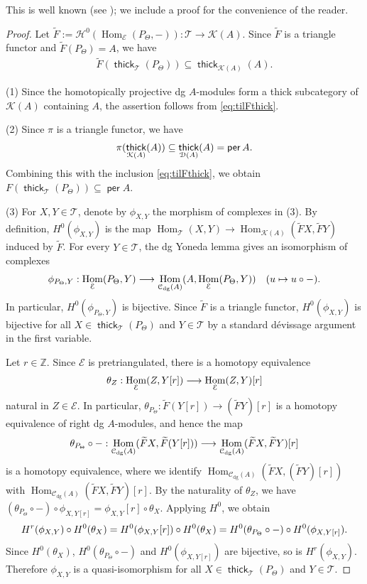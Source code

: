 \documentclass[a4paper,reqno,11pt]{amsart}
\numberwithin{equation}{section}
\theoremstyle{definition}
\newcommand{\C}{\mathcal{C}}
\newcommand{\D}{\mathcal{D}}
\newcommand{\E}{\mathcal{E}}
\renewcommand{\H}{\mathcal{H}}
\newcommand{\K}{\mathcal{K}}
\newcommand{\T}{\mathcal{T}}
\newcommand{\ZZ}{\mathbb{Z}}
\newcommand{\bte}{\Theta}
\newcommand{\til}[1]{\widetilde{#1}}
\newcommand{\lto}{\longrightarrow}
\DeclareMathOperator{\thick}{\mathsf{thick}}
\DeclareMathOperator{\per}{\mathsf{per}}
\DeclareMathOperator{\Hom}{Hom}
\newcommand{\dgmod}{\C_{\mathrm{dg}}}
\begin{document}
This is well known (see \cite{K94, K06}); we include a proof for the convenience of the reader.

\begin{proof}
Let $\til{F}:=\H^{0}(\Hom_{\E}(P_{\bte},-)):\T\to\K(A)$.
Since $\til{F}$ is a triangle functor and $\til{F}(P_{\bte})=A$, we have
\begin{align}\label{eq:tilFthick}
\til{F}(\thick_{\T}(P_{\bte}))\subseteq\thick_{\K(A)}(A).
\end{align}

(1) Since the homotopically projective dg $A$-modules form a thick subcategory of $\K(A)$ containing $A$, the assertion follows from \eqref{eq:tilFthick}.

(2) Since $\pi$ is a triangle functor, we have
\begin{align}
\pi(\thick_{\K(A)}(A))\subseteq\thick_{\D(A)}(A)=\per A.\notag
\end{align}
Combining this with the inclusion \eqref{eq:tilFthick}, we obtain $F(\thick_{\T}(P_{\bte}))\subseteq\per A$.

(3) For $X,Y\in\T$, denote by $\phi_{X,Y}$ the morphism of complexes in (3).
By definition, $H^{0}(\phi_{X,Y})$ is the map $\Hom_{\T}(X,Y)\to\Hom_{\K(A)}(\til{F}X,\til{F}Y)$ induced by $\til{F}$.
For every $Y\in\T$, the dg Yoneda lemma \cite[1.2]{K94} gives an isomorphism of complexes
\begin{align}
\phi_{P_{\bte},Y}:\Hom_{\E}(P_{\bte},Y)\lto\Hom_{\dgmod(A)}(A,\Hom_{\E}(P_{\bte},Y))\quad(u\mapsto u\circ-).\notag
\end{align}
In particular, $H^{0}(\phi_{P_{\bte},Y})$ is bijective.
Since $\til{F}$ is a triangle functor, $H^{0}(\phi_{X,Y})$ is bijective for all $X\in\thick_{\T}(P_{\bte})$ and $Y\in\T$ by a standard d\'evissage argument in the first variable.

Let $r\in\ZZ$.
Since $\E$ is pretriangulated, there is a homotopy equivalence
\begin{align}
\theta_{Z}:\Hom_{\E}(Z,Y[r])\lto\Hom_{\E}(Z,Y)[r]\notag
\end{align}
natural in $Z\in\E$.
In particular, $\theta_{P_{\bte}}:\til{F}(Y[r])\to(\til{F}Y)[r]$ is a homotopy equivalence of right dg $A$-modules, and hence the map
\begin{align}
\theta_{P_{\bte}}\circ-:\Hom_{\dgmod(A)}(\til{F}X,\til{F}(Y[r]))\lto\Hom_{\dgmod(A)}(\til{F}X,\til{F}Y)[r]\notag
\end{align}
is a homotopy equivalence, where we identify $\Hom_{\dgmod(A)}(\til{F}X,(\til{F}Y)[r])$ with $\Hom_{\dgmod(A)}(\til{F}X,\til{F}Y)[r]$.
By the naturality of $\theta_{Z}$, we have $(\theta_{P_{\bte}}\circ-)\circ\phi_{X,Y[r]}=\phi_{X,Y}[r]\circ\theta_{X}$.
Applying $H^{0}$, we obtain
\begin{align}
H^{r}(\phi_{X,Y})\circ H^{0}(\theta_{X})=H^{0}(\phi_{X,Y}[r])\circ H^{0}(\theta_{X})=H^{0}(\theta_{P_{\bte}}\circ-)\circ H^{0}(\phi_{X,Y[r]}).\notag
\end{align}
Since $H^{0}(\theta_{X})$, $H^{0}(\theta_{P_{\bte}}\circ-)$ and $H^{0}(\phi_{X,Y[r]})$ are bijective, so is $H^{r}(\phi_{X,Y})$.
Therefore $\phi_{X,Y}$ is a quasi-isomorphism for all $X\in\thick_{\T}(P_{\bte})$ and $Y\in\T$.


\end{proof}
\end{document}
